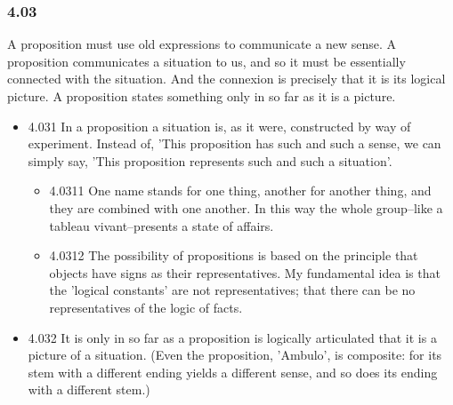 \documentclass[11pt]{article}
\begin{document}
\subsubsection*{4.03}
\label{sec:orgbc88676}
A proposition must use old expressions to communicate a new sense. A
proposition communicates a situation to us, and so it must be essentially
connected with the situation. And the connexion is precisely that it is its
logical picture. A proposition states something only in so far as it is a
picture.
\begin{itemize}
\item 4.031
\label{sec:orgcda6efc}
In a proposition a situation is, as it were, constructed by way of
experiment. Instead of, 'This proposition has such and such a sense, we can
simply say, 'This proposition represents such and such a situation'.
\begin{itemize}
\item 4.0311
\label{sec:orgc091685}
One name stands for one thing, another for another thing, and they
are combined with one another. In this way the whole group--like a tableau
vivant--presents a state of affairs.
\item 4.0312
\label{sec:orgc594c9a}
The possibility of propositions is based on the principle that
objects have signs as their representatives. My fundamental idea is that
the 'logical constants' are not representatives; that there can be no
representatives of the logic of facts.
\end{itemize}
\item 4.032
\label{sec:orgebd2b61}
It is only in so far as a proposition is logically articulated that
it is a picture of a situation. (Even the proposition, 'Ambulo', is
composite: for its stem with a different ending yields a different sense,
and so does its ending with a different stem.)
\end{itemize}
\end{document}
